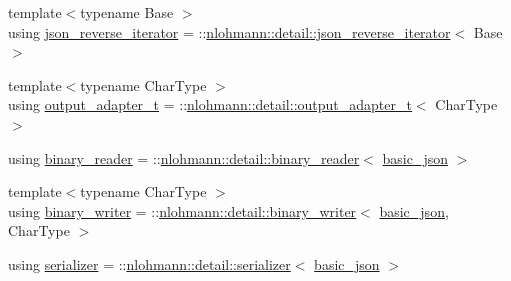 \begin{DoxyCompactItemize}
\item 
{\footnotesize template$<$typename Base $>$ }\\using \hyperlink{classnlohmann_1_1basic__json_a8d18136ac63e52780e9d7441981a2db4}{json\+\_\+reverse\+\_\+iterator} = \+::\hyperlink{classnlohmann_1_1detail_1_1json__reverse__iterator}{nlohmann\+::detail\+::json\+\_\+reverse\+\_\+iterator}$<$ Base $>$
\item 
{\footnotesize template$<$typename Char\+Type $>$ }\\using \hyperlink{classnlohmann_1_1basic__json_a5f17a041e3338ea006eaac2d89446c0d}{output\+\_\+adapter\+\_\+t} = \+::\hyperlink{namespacenlohmann_1_1detail_a0fd8edff7729aa2dd92b070964bade2e}{nlohmann\+::detail\+::output\+\_\+adapter\+\_\+t}$<$ Char\+Type $>$
\item 
using \hyperlink{classnlohmann_1_1basic__json_a7e06ed27ff517575ccb23fc23fca2b8f}{binary\+\_\+reader} = \+::\hyperlink{classnlohmann_1_1detail_1_1binary__reader}{nlohmann\+::detail\+::binary\+\_\+reader}$<$ \hyperlink{classnlohmann_1_1basic__json}{basic\+\_\+json} $>$
\item 
{\footnotesize template$<$typename Char\+Type $>$ }\\using \hyperlink{classnlohmann_1_1basic__json_af32e8be561b513f946e3ca511e968d58}{binary\+\_\+writer} = \+::\hyperlink{classnlohmann_1_1detail_1_1binary__writer}{nlohmann\+::detail\+::binary\+\_\+writer}$<$ \hyperlink{classnlohmann_1_1basic__json}{basic\+\_\+json}, Char\+Type $>$
\item 
using \hyperlink{classnlohmann_1_1basic__json_a68557c31b3bdf31c12e148baecec0d23}{serializer} = \+::\hyperlink{classnlohmann_1_1detail_1_1serializer}{nlohmann\+::detail\+::serializer}$<$ \hyperlink{classnlohmann_1_1basic__json}{basic\+\_\+json} $>$
\end{DoxyCompactItemize}
